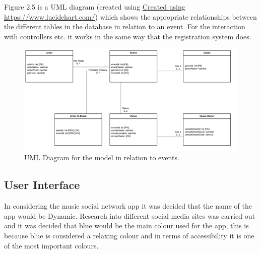 Figure 2.5 is a UML diagram (created using \url{Created using https://www.lucidchart.com/}) which shows the appropriate relationships between the different tables in the database in relation to an event. For the interaction with controllers etc. it works in the same way that the registration system does.
\begin{figure}[H]
\includegraphics[width=\textwidth,height=\textheight,keepaspectratio]{images/events}
\caption{UML Diagram for the model in relation to events.}
\end{figure}


\subsection{User Interface}
In considering the music social network app it was decided that the name of the app would be Dynamic. Research into different social media sites was carried out and it was decided that blue would be the main colour used for the app, this is because blue is considered a relaxing colour and in terms of accessibility it is one of the most important colours.
